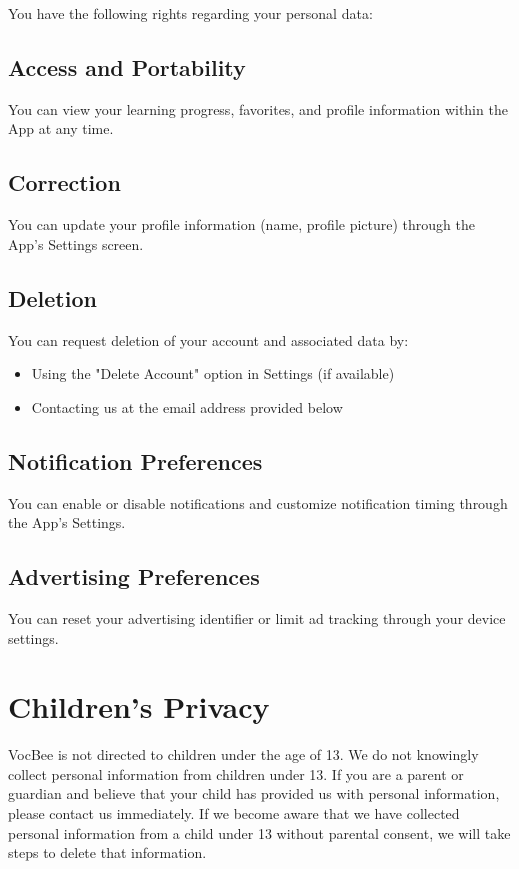 \documentclass[11pt,a4paper]{article}
\begin{document}
You have the following rights regarding your personal data:

\subsection{Access and Portability}

You can view your learning progress, favorites, and profile information within the App at any time.

\subsection{Correction}

You can update your profile information (name, profile picture) through the App's Settings screen.

\subsection{Deletion}

You can request deletion of your account and associated data by:
\begin{itemize}[leftmargin=2em]
    \item Using the "Delete Account" option in Settings (if available)
    \item Contacting us at the email address provided below
\end{itemize}

\subsection{Notification Preferences}

You can enable or disable notifications and customize notification timing through the App's Settings.

\subsection{Advertising Preferences}

You can reset your advertising identifier or limit ad tracking through your device settings.

\section{Children's Privacy}

VocBee is not directed to children under the age of 13. We do not knowingly collect personal information from children under 13. If you are a parent or guardian and believe that your child has provided us with personal information, please contact us immediately. If we become aware that we have collected personal information from a child under 13 without parental consent, we will take steps to delete that information.
\end{document}
